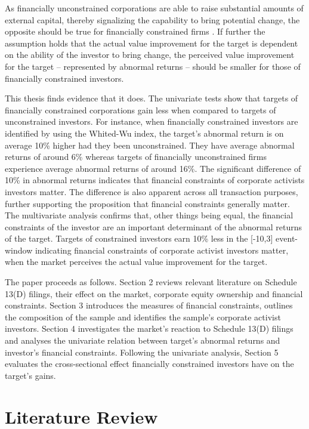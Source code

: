 \documentclass[12pt]{article}
\begin{document}
As financially unconstrained corporations are able to raise substantial amounts of external capital, thereby signalizing the capability to bring potential change, the opposite should be true for financially constrained firms \citep[p.272]{Farre-Mensa2016}. If further the assumption holds that the actual value improvement for the target is dependent on the ability of the investor to bring change, the perceived value improvement for the target -- represented by abnormal returns -- should be smaller for those of financially constrained investors.\par 
This thesis finds evidence that it does. The univariate tests show that targets of financially constrained corporations gain less when compared to targets of unconstrained investors. For instance, when financially constrained investors are identified by using the Whited-Wu index, the target's abnormal return is on average 10\% higher had they been unconstrained. They have average abnormal returns of around 6\% whereas targets of financially unconstrained firms experience average abnormal returns of around 16\%. The significant difference of 10\% in abnormal returns indicates that financial constraints of corporate activists investors matter. The difference is also apparent across all transaction purposes, further supporting the proposition that financial constraints generally matter. The multivariate analysis confirms that, other things being equal, the financial constraints of the investor are an important determinant of the abnormal returns of the target. Targets of constrained investors earn 10\% less in the [-10,3] event-window indicating financial constraints of corporate activist investors matter, when the market perceives the actual value improvement for the target.\par
The paper proceeds as follows. Section 2 reviews relevant literature on Schedule 13(D) filings, their effect on the market, corporate equity ownership and financial constraints. Section 3 introduces the measures of financial constraints, outlines the composition of the sample and identifies the sample's corporate activist investors. Section 4 investigates the market's reaction to Schedule 13(D) filings and analyses the univariate relation between target's abnormal returns and investor's financial constraints. Following the univariate analysis, Section 5 evaluates the cross-sectional effect financially constrained investors have on the target's gains.

\section{Literature Review}
\end{document}
